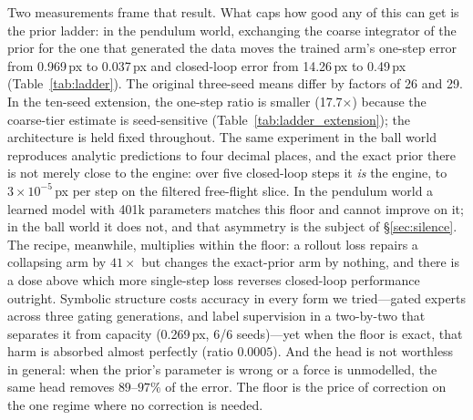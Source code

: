 \documentclass{article}
\begin{document}
Two measurements frame that result. What caps how good any of this can get is the prior
ladder: in the pendulum world, exchanging the coarse integrator of the prior for the one
that generated the data moves the trained arm's one-step error from 0.969\,px to
0.037\,px and closed-loop error from 14.26\,px to 0.49\,px (Table~\ref{tab:ladder}).
The original three-seed means differ by factors of 26 and 29. In the ten-seed extension,
the one-step ratio is smaller (17.7$\times$) because the coarse-tier estimate is seed-sensitive
(Table~\ref{tab:ladder_extension}); the architecture is held fixed throughout. The same experiment in the ball world reproduces analytic
predictions to four decimal places, and the exact prior there is not merely close to the
engine: over five closed-loop steps it \emph{is} the engine, to
$3{\times}10^{-5}$\,px per step on the filtered free-flight slice. In the pendulum world a learned model with 401k parameters matches this floor
and cannot improve on it; in the ball world it does not, and that asymmetry is the subject of \S\ref{sec:silence}. The recipe, meanwhile, multiplies within the floor: a rollout
loss repairs a collapsing arm by $41\times$ but changes the exact-prior arm by nothing,
and there is a dose above which more single-step loss reverses closed-loop performance
outright. Symbolic structure costs accuracy in every form we tried---gated experts
across three gating generations, and label supervision in a two-by-two that
separates it from capacity (0.269\,px, 6/6 seeds)---yet when
the floor is exact, that harm is absorbed almost perfectly (ratio $0.0005$). And the
head is not worthless in general: when the prior's parameter is wrong or a force is
unmodelled, the same head removes $89$--$97\%$ of the error. The floor is the price of
correction on the one regime where no correction is needed.
\end{document}
